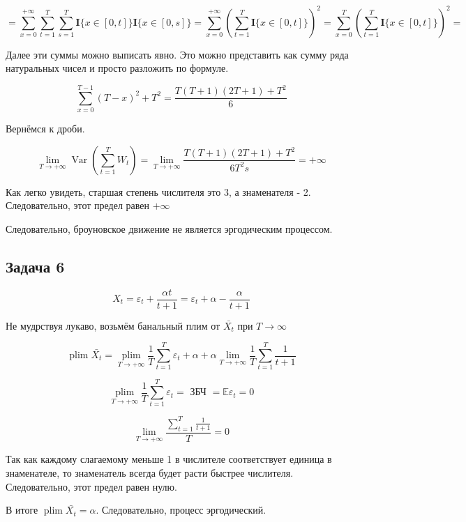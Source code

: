 \documentclass[a4paper,12pt]{article}
\def \e{\varepsilon}
\DeclareMathOperator*{\plim}{plim}
\def \mbf{\mathbf}
\def \mbb{\mathbb}
\DeclareMathOperator{\Var}{Var}
\def \E{\mbb{E}}
\def \I{\mbf{I}}
\def \e{\varepsilon}
\begin{document}
\[= \sum_{x=0}^{+\infty} \sum_{t = 1}^{T} \sum_{s = 1}^{T}  \I\{x\in [0, t]\}\I\{x\in [0, s]\} =  \sum_{x=0}^{+\infty} (\sum_{t = 1}^{T}  \I\{x\in [0, t]\})^2 =  \sum_{x=0}^{T} (\sum_{t = 1}^{T}  \I\{x\in [0, t]\})^2 = \]


Далее эти суммы можно выписать явно. Это можно представить как сумму ряда натуральных чисел и просто разложить по формуле.

\[ \sum_{x=0}^{T-1}(T-x)^2 + T^2  =  \frac{T(T+1)(2T+1) + T^2}{6}\]

Вернёмся к дроби.

\[ \lim\limits_{T\to +\infty}\Var(\sum_{t=1}^{T} W_t) = \lim\limits_{T\to +\infty} \frac{T(T+1)(2T+1) + T^2}{6T^2s} = +\infty \]

Как легко увидеть, старшая степень числителя это 3, а знаменателя - 2. Следовательно, этот предел равен $ +\infty $

Следовательно, броуновское движение не является эргодическим процессом.

\subsection{Задача 6}

\[ X_t = \e_t + \frac{\alpha t}{t + 1} = \e_t + \alpha - \frac{\alpha}{t + 1} \]

Не мудрствуя лукаво, возьмём банальный плим от $ \bar{X_t} $ при $ T \to \infty $

\[ \plim \bar{X_t} = \plim\limits_{T \to +\infty} \frac{1}{T} \sum_{t = 1}^{T} \e_t + \alpha + \alpha \lim\limits_{T \to +\infty}  \frac{1}{T}\sum_{t = 1}^{T}  \frac{1}{t+1}\]

\[  \plim\limits_{T \to +\infty} \frac{1}{T} \sum_{t = 1}^{T} \e_t = \text{ ЗБЧ } = \E\e_t = 0
 \]
 
 \[ \lim\limits_{T \to +\infty} \frac{\sum_{t = 1}^{T}  \frac{1}{t+1}}{T}  = 0 \]
 
 Так как каждому слагаемому меньше 1 в числителе соответствует единица в знаменателе, то знаменатель всегда будет расти быстрее числителя. Следовательно, этот предел равен нулю.
 
 В итоге $  \plim \bar{X_t} = \alpha $. Следовательно, процесс эргодический.
\end{document}
